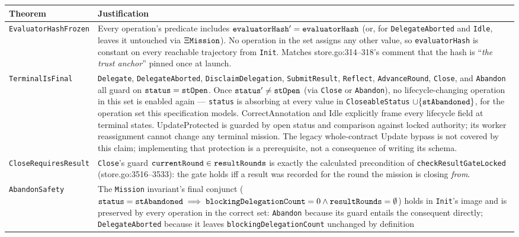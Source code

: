 \documentclass[a4paper,10pt,fleqn]{article}
\newcommand{\field}[1]{\ifmmode\texttt{#1}\else\texorpdfstring{\breakfield{#1}}{#1}\fi}
\begin{document}
\begin{longtable}{@{}>{\raggedright\arraybackslash}p{}>{\raggedright\arraybackslash}p{}@{}}
\toprule
\textbf{Theorem} & \textbf{Justification} \\
\midrule
\endhead
\bottomrule
\endfoot
\field{EvaluatorHashFrozen} &
  Every operation's predicate includes
  $\field{evaluatorHash}' = \field{evaluatorHash}$ (or, for
  \field{DelegateAborted} and \field{Idle}, leaves it untouched via
  $\Xi \field{Mission}$). No operation in the set assigns any other
  value, so \field{evaluatorHash} is constant on every reachable
  trajectory from \field{Init}. Matches store.go:314--318's comment
  that the hash is ``\emph{the trust anchor}'' pinned once at
  launch. \\
\field{TerminalIsFinal} &
  \field{Delegate}, \field{DelegateAborted}, \field{DisclaimDelegation},
  \field{SubmitResult}, \field{Reflect}, \field{AdvanceRound},
  \field{Close}, and \field{Abandon} all guard on $\field{status} =
  \field{stOpen}$. Once $\field{status}' \neq \field{stOpen}$ (via
  \field{Close} or \field{Abandon}), no lifecycle-changing operation
  in this set is enabled again --- \field{status} is absorbing at every value in
  \field{CloseableStatus} $\cup \{ \field{stAbandoned} \}$, for the
  operation set this specification models. CorrectAnnotation and Idle
  explicitly frame every lifecycle field at terminal states.
  UpdateProtected is guarded by open status and comparison against
  locked authority; its worker reassignment cannot change any terminal
  mission. The legacy whole-contract Update bypass
  is not covered by this claim; implementing that protection is a
  prerequisite, not a consequence of writing its schema. \\
\field{CloseRequiresResult} &
  \field{Close}'s guard $\field{currentRound} \in
  \field{resultRounds}$ is exactly the calculated precondition of
  \field{checkResultGateLocked} (store.go:3516--3533): the gate holds
  iff a result was recorded for the round the mission is closing
  \emph{from}. \\
\field{AbandonSafety} &
  The \field{Mission} invariant's final conjunct
  ($\field{status} = \field{stAbandoned} \implies
  \field{blockingDelegationCount} = 0 \land \field{resultRounds} =
  \emptyset$) holds in \field{Init}'s image and is preserved by every
  operation in the correct set: \field{Abandon} because its guard
  entails the consequent directly; \field{DelegateAborted} because it
  leaves \field{blockingDelegationCount} unchanged by definition

\end{longtable}
\end{document}

